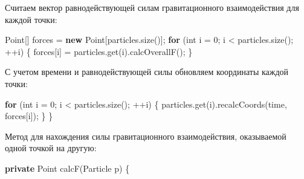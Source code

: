 \documentclass[
  12pt,
  a4paper,
]{article}
\newenvironment{Shaded}{}{}
\newcommand{\BuiltInTok}[1]{#1}
\newcommand{\ControlFlowTok}[1]{\textcolor[rgb]{0.00,0.44,0.13}{\textbf{#1}}}
\newcommand{\DataTypeTok}[1]{\textcolor[rgb]{0.56,0.13,0.00}{#1}}
\newcommand{\DecValTok}[1]{\textcolor[rgb]{0.25,0.63,0.44}{#1}}
\newcommand{\FunctionTok}[1]{\textcolor[rgb]{0.02,0.16,0.49}{#1}}
\newcommand{\KeywordTok}[1]{\textcolor[rgb]{0.00,0.44,0.13}{\textbf{#1}}}
\newcommand{\NormalTok}[1]{#1}
\newcommand{\OperatorTok}[1]{\textcolor[rgb]{0.40,0.40,0.40}{#1}}
\begin{document}
Считаем вектор равнодействующей силам гравитационного взаимодействия для
каждой точки:

\begin{Shaded}
\begin{Highlighting}[]
\BuiltInTok{Point}\OperatorTok{[]}\NormalTok{ forces }\OperatorTok{=} \KeywordTok{new} \BuiltInTok{Point}\OperatorTok{[}\NormalTok{particles}\OperatorTok{.}\FunctionTok{size}\OperatorTok{()];}
\ControlFlowTok{for} \OperatorTok{(}\DataTypeTok{int}\NormalTok{ i }\OperatorTok{=} \DecValTok{0}\OperatorTok{;}\NormalTok{ i }\OperatorTok{\textless{}}\NormalTok{ particles}\OperatorTok{.}\FunctionTok{size}\OperatorTok{();} \OperatorTok{++}\NormalTok{i}\OperatorTok{)} \OperatorTok{\{}
\NormalTok{    forces}\OperatorTok{[}\NormalTok{i}\OperatorTok{]} \OperatorTok{=}\NormalTok{ particles}\OperatorTok{.}\FunctionTok{get}\OperatorTok{(}\NormalTok{i}\OperatorTok{).}\FunctionTok{calcOverallF}\OperatorTok{();}
\OperatorTok{\}}
\end{Highlighting}
\end{Shaded}

С учетом времени и равнодействующей силы обновляем координаты каждой
точки:

\begin{Shaded}
\begin{Highlighting}[]
    \ControlFlowTok{for} \OperatorTok{(}\DataTypeTok{int}\NormalTok{ i }\OperatorTok{=} \DecValTok{0}\OperatorTok{;}\NormalTok{ i }\OperatorTok{\textless{}}\NormalTok{ particles}\OperatorTok{.}\FunctionTok{size}\OperatorTok{();} \OperatorTok{++}\NormalTok{i}\OperatorTok{)} \OperatorTok{\{}
\NormalTok{        particles}\OperatorTok{.}\FunctionTok{get}\OperatorTok{(}\NormalTok{i}\OperatorTok{).}\FunctionTok{recalcCoords}\OperatorTok{(}\NormalTok{time}\OperatorTok{,}\NormalTok{ forces}\OperatorTok{[}\NormalTok{i}\OperatorTok{]);}
    \OperatorTok{\}}
\OperatorTok{\}}
\end{Highlighting}
\end{Shaded}

Метод для нахождения силы гравитационного взаимодействия, оказываемой
одной точкой на другую:

\begin{Shaded}
\begin{Highlighting}[]
\KeywordTok{private} \BuiltInTok{Point} \FunctionTok{calcF}\OperatorTok{(}\NormalTok{Particle p}\OperatorTok{)} \OperatorTok{\{}
\end{Highlighting}
\end{Shaded}
\end{document}
